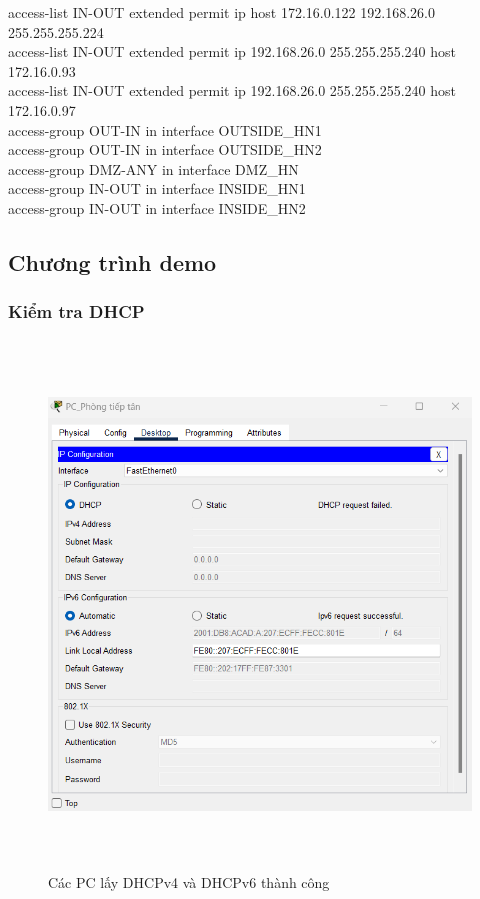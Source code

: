 \documentclass[12pt,a4paper]{report}
\begin{document}
{\hspace*{1cm}access-list IN-OUT extended permit ip host 172.16.0.122 192.168.26.0 255.255.255.224\\
\hspace*{1cm}access-list IN-OUT extended permit ip 192.168.26.0 255.255.255.240 host 172.16.0.93\\
\hspace*{1cm}access-list IN-OUT extended permit ip 192.168.26.0 255.255.255.240 host 172.16.0.97\\
\hspace*{1cm}access-group OUT-IN in interface OUTSIDE\_HN1\\
\hspace*{1cm}access-group OUT-IN in interface OUTSIDE\_HN2\\
\hspace*{1cm}access-group DMZ-ANY in interface DMZ\_HN \\
\hspace*{1cm}access-group IN-OUT in interface INSIDE\_HN1 \\
\hspace*{1cm}access-group IN-OUT in interface INSIDE\_HN2\\}

\subsection{Chương trình demo  }
\subsubsection{Kiểm tra DHCP}

\begin{figure}[H]
    \centering
    \includegraphics[width=16cm, height=14cm]{img/getDHCP.png}
    \caption{Các PC lấy DHCPv4 và DHCPv6 thành công}
    \label{hinh4131a}
\end{figure}
\cleardoublepage
\end{document}
